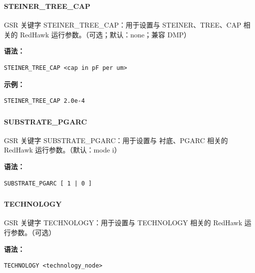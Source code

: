 \subsubsection{}
\paragraph*{STEINER_TREE_CAP}

GSR 关键字 STEINER_TREE_CAP：用于设置与 STEINER、TREE、CAP 相关的 RedHawk 运行参数。（可选；默认：none；兼容 DMP）

\textbf{语法：}
\begin{lstlisting}
STEINER_TREE_CAP <cap in pF per um>
\end{lstlisting}

\textbf{示例：}
\begin{lstlisting}
STEINER_TREE_CAP 2.0e-4
\end{lstlisting}

\subsubsection{}
\paragraph*{SUBSTRATE_PGARC}

GSR 关键字 SUBSTRATE_PGARC：用于设置与 衬底、PGARC 相关的 RedHawk 运行参数。（默认：mode i）

\textbf{语法：}
\begin{lstlisting}
SUBSTRATE_PGARC [ 1 | 0 ]
\end{lstlisting}

\subsubsection{}
\paragraph*{TECHNOLOGY}

GSR 关键字 TECHNOLOGY：用于设置与 TECHNOLOGY 相关的 RedHawk 运行参数。（可选）

\textbf{语法：}
\begin{lstlisting}
TECHNOLOGY <technology_node>
\end{lstlisting}

\subsubsection{}
